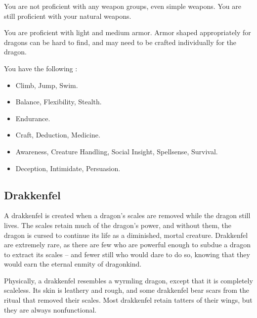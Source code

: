             You are not proficient with any weapon groups, even simple weapons.
            You are still proficient with your natural weapons.

            You are proficient with light and medium armor.
            Armor shaped appropriately for dragons can be hard to find, and may need to be crafted individually for the dragon.

            You have the following :
            \begin{itemize}
                \item {} Climb, Jump, Swim.
                \item {} Balance, Flexibility, Stealth.
                \item {} Endurance.
                \item {} Craft, Deduction, Medicine.
                \item {} Awareness, Creature Handling, Social Insight, Spellsense, Survival.
                \item {} Deception, Intimidate, Persuasion.
            \end{itemize}

    \subsection{Drakkenfel}

        A drakkenfel is created when a dragon's scales are removed while the dragon still lives. The scales retain much of the dragon's power, and without them, the dragon is cursed to continue its life as a diminished, mortal creature.
        Drakkenfel are extremely rare, as there are few who are powerful enough to subdue a dragon to extract its scales -- and fewer still who would dare to do so, knowing that they would earn the eternal enmity of dragonkind.

        Physically, a drakkenfel resembles a wyrmling dragon, except that it is completely scaleless.
        Its skin is leathery and rough, and some drakkenfel bear scars from the ritual that removed their scales.
        Most drakkenfel retain tatters of their wings, but they are always nonfunctional.

